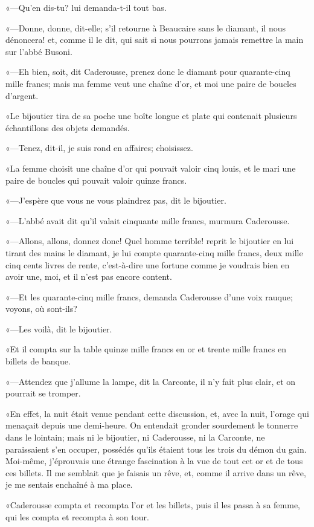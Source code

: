 «—Qu'en dis-tu? lui demanda-t-il tout bas. 

«—Donne, donne, dit-elle; s'il retourne à Beaucaire sans le diamant, il nous dénoncera! et, comme il le dit, qui sait si nous pourrons jamais remettre la main sur l'abbé Busoni. 

«—Eh bien, soit, dit Caderousse, prenez donc le diamant pour quarante-cinq mille francs; mais ma femme veut une chaîne d'or, et moi une paire de boucles d'argent. 

«Le bijoutier tira de sa poche une boîte longue et plate qui contenait plusieurs échantillons des objets demandés. 

«—Tenez, dit-il, je suis rond en affaires; choisissez. 

«La femme choisit une chaîne d'or qui pouvait valoir cinq louis, et le mari une paire de boucles qui pouvait valoir quinze francs. 

«—J'espère que vous ne vous plaindrez pas, dit le bijoutier. 

«—L'abbé avait dit qu'il valait cinquante mille francs, murmura Caderousse.  

«—Allons, allons, donnez donc! Quel homme terrible! reprit le bijoutier en lui tirant des mains le diamant, je lui compte quarante-cinq mille francs, deux mille cinq cents livres de rente, c'est-à-dire une fortune comme je voudrais bien en avoir une, moi, et il n'est pas encore content. 

«—Et les quarante-cinq mille francs, demanda Caderousse d'une voix rauque; voyons, où sont-ils? 

«—Les voilà, dit le bijoutier. 

«Et il compta sur la table quinze mille francs en or et trente mille francs en billets de banque.  

«—Attendez que j'allume la lampe, dit la Carconte, il n'y fait plus clair, et on pourrait se tromper. 

«En effet, la nuit était venue pendant cette discussion, et, avec la nuit, l'orage qui menaçait depuis une demi-heure. On entendait gronder sourdement le tonnerre dans le lointain; mais ni le bijoutier, ni Caderousse, ni la Carconte, ne paraissaient s'en occuper, possédés qu'ils étaient tous les trois du démon du gain. Moi-même, j'éprouvais une étrange fascination à la vue de tout cet or et de tous ces billets. Il me semblait que je faisais un rêve, et, comme il arrive dans un rêve, je me sentais enchaîné à ma place. 

«Caderousse compta et recompta l'or et les billets, puis il les passa à sa femme, qui les compta et recompta à son tour. 

